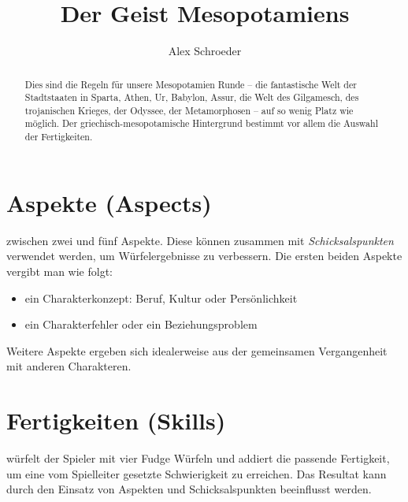 \documentclass{tufte-handout}
\title{Der Geist Mesopotamiens}
\author{Alex Schroeder}
\begin{document}
\maketitle%

\begin{abstract}
\noindent Dies sind die Regeln für unsere Mesopotamien Runde -- die
fantastische Welt der Stadtstaaten in Sparta, Athen, Ur, Babylon,
Assur, die Welt des Gilgamesch, des trojanischen Krieges, der Odyssee,
der Metamorphosen -- auf so wenig Platz wie möglich. Der
griechisch-mesopotamische Hintergrund bestimmt vor allem die Auswahl
der Fertigkeiten.
\end{abstract}


\section{Aspekte (Aspects)}

 zwischen zwei und fünf Aspekte.
 Diese können zusammen mit
\textit{Schicksalspunkten} verwendet werden, um Würfelergebnisse zu
verbessern. Die ersten beiden Aspekte vergibt man wie folgt:

\begin{itemize}\itemsep0pt
\item ein Charakterkonzept: Beruf, Kultur oder Persönlichkeit
\item ein Charakterfehler oder ein Beziehungsproblem
\end{itemize}

\noindent Weitere Aspekte ergeben sich idealerweise aus der
gemeinsamen Vergangenheit mit anderen Charakteren.


\section{Fertigkeiten (Skills)}

 würfelt der Spieler mit vier Fudge
Würfeln und addiert die
passende Fertigkeit, um eine vom Spielleiter gesetzte Schwierigkeit zu
erreichen. Das Resultat kann durch den Einsatz von Aspekten und
Schicksalspunkten beeinflusst werden.
\end{document}
